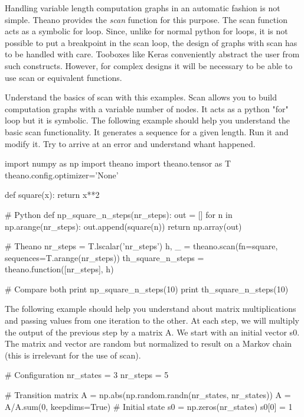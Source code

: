 Handling variable length computation graphs in an automatic fashion is not simple. 
Theano provides the \textit{scan} function for this purpose. The scan function acts
as a symbolic for loop. Since, unlike for normal python for loops, it is not
possible to put a breakpoint in the scan loop, the design of graphs
with scan has to be handled with care. Tooboxes like Keras conveniently abstract
the user from such constructs. However, for complex designs it will be
necessary to be able to use scan or equivalent functions. 

\begin{exercise}
Understand the basics of scan with this examples. Scan allows you to build
computation graphs with a variable number of nodes. It acts as a python "for"
loop but it is symbolic. The following example should help you understand the
basic scan functionality. It generates a sequence for a given length. Run it
and modify it. Try to arrive at an error and understand whant happened.
\begin{python}
import numpy as np
import theano
import theano.tensor as T
theano.config.optimizer='None'

def square(x): 
    return x**2 

# Python
def np_square_n_steps(nr_steps):
    out = []
    for n in np.arange(nr_steps):
        out.append(square(n))
    return np.array(out)


\end{python}
\begin{python}
# Theano
nr_steps = T.lscalar('nr_steps')
h, _ = theano.scan(fn=square, sequences=T.arange(nr_steps))
th_square_n_steps = theano.function([nr_steps], h)

# Compare both
print np_square_n_steps(10)
print th_square_n_steps(10)
\end{python}
The following example should help you understand about matrix multiplications
and passing values from one iteration to the other. At each step, we will
multiply the output of the previous step by a matrix A. We start with an
initial vector s0. The matrix and vector are random but normalized to result on
a Markov chain (this is irrelevant for the use of scan).  
\begin{python}
# Configuration
nr_states = 3
nr_steps = 5

# Transition matrix
A = np.abs(np.random.randn(nr_states, nr_states))
A = A/A.sum(0, keepdims=True)
# Initial state
s0 = np.zeros(nr_states)
s0[0] = 1
\end{python}



\end{exercise}
